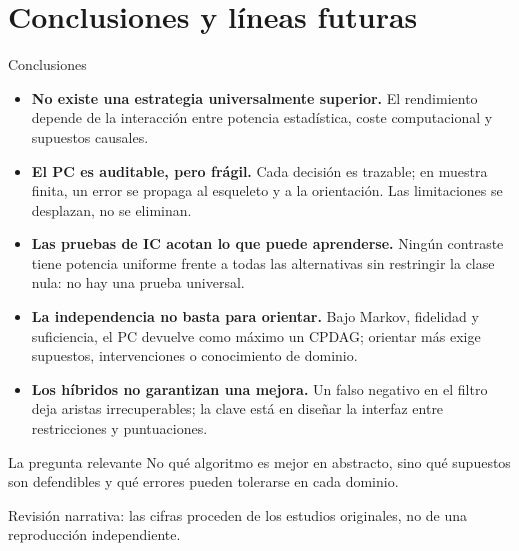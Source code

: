 \documentclass[aspectratio=169,11pt]{beamer}
\begin{document}
{

\section[Conclusiones y líneas futuras]{Conclusiones y líneas futuras}
}
\begin{frame}[t]{Conclusiones}
  \footnotesize
  \begin{itemize}\setlength{\itemsep}{2pt}
    \item \textbf{No existe una estrategia universalmente superior.} El
          rendimiento depende de la interacción entre potencia estadística,
          coste computacional y supuestos causales.
    \item \textbf{El PC es auditable, pero frágil.} Cada decisión es trazable;
          en muestra finita, un error se propaga al esqueleto y a la
          orientación. Las limitaciones se desplazan, no se eliminan.
    \item \textbf{Las pruebas de IC acotan lo que puede aprenderse.} Ningún
          contraste tiene potencia uniforme frente a todas las alternativas sin
          restringir la clase nula: no hay una prueba universal.
    \item \textbf{La independencia no basta para orientar.} Bajo Markov,
          fidelidad y suficiencia, el PC devuelve como máximo un CPDAG; orientar
          más exige supuestos, intervenciones o conocimiento de dominio.
    \item \textbf{Los híbridos no garantizan una mejora.} Un falso negativo en
          el filtro deja aristas irrecuperables; la clave está en diseñar la
          interfaz entre restricciones y puntuaciones.
  \end{itemize}
  \vfill
  \begin{exampleblock}{La pregunta relevante}
    \centering No qué algoritmo es mejor en abstracto, sino \alert{qué supuestos
    son defendibles} y \alert{qué errores pueden tolerarse} en cada dominio.
  \end{exampleblock}
  {\scriptsize\color{upmgray}Revisión narrativa: las cifras proceden de los
  estudios originales, no de una reproducción independiente.}
\end{frame}
\end{document}
